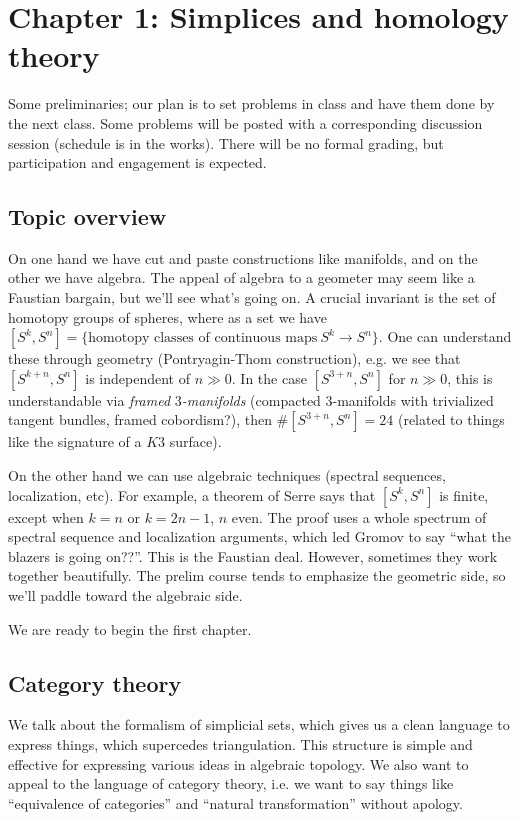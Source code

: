 \section{Chapter 1: Simplices and homology theory}
Some preliminaries; our plan is to set problems in class and have them done by the next class. Some problems will be posted with a corresponding discussion session (schedule is in the works). There will be no formal grading, but participation and engagement is expected.

\subsection{Topic overview}
On one hand we have cut and paste constructions like manifolds, and on the other we have algebra. The appeal of algebra to a geometer may seem like a Faustian bargain, but we'll see what's going on. A crucial invariant is the set of homotopy groups of spheres, where as a set we have $[S^k,S^n ]= \{ \text{homotopy classes of continuous maps} \ S^k \to S^n \} $. One can understand these through geometry (Pontryagin-Thom construction), e.g. we see that $[S ^{k+n},S^n ]$ is independent of $n\gg 0$. In the case $[S^{3+n},S^n ]$ for $n\gg 0$, this is understandable via \textit{framed} $3$\textit{-manifolds} (compacted $3$-manifolds with trivialized tangent bundles, framed cobordism?), then $\#[S^{3+n},S^n ]=24$ (related to things like the signature of a $K 3$ surface). 

On the other hand we can use algebraic techniques (spectral sequences, localization, etc). For example, a theorem of Serre says that $[S^k, S^n ]$ is finite, except when $k=n$ or $k=2n-1$, $n$ even. The proof uses a whole spectrum of spectral sequence and localization arguments, which led Gromov to say ``what the blazers is going on??''. This is the Faustian deal. However, sometimes they work together beautifully. The prelim course tends to emphasize the geometric side, so we'll paddle toward the algebraic side.

We are ready to begin the first chapter.

\subsection{Category theory}
We talk about the formalism of simplicial sets, which gives us a clean language to express things, which supercedes triangulation. This structure is simple and effective for expressing various ideas in algebraic topology. We also want to appeal to the language of category theory, i.e. we want to say things like ``equivalence of categories'' and ``natural transformation'' without apology.

